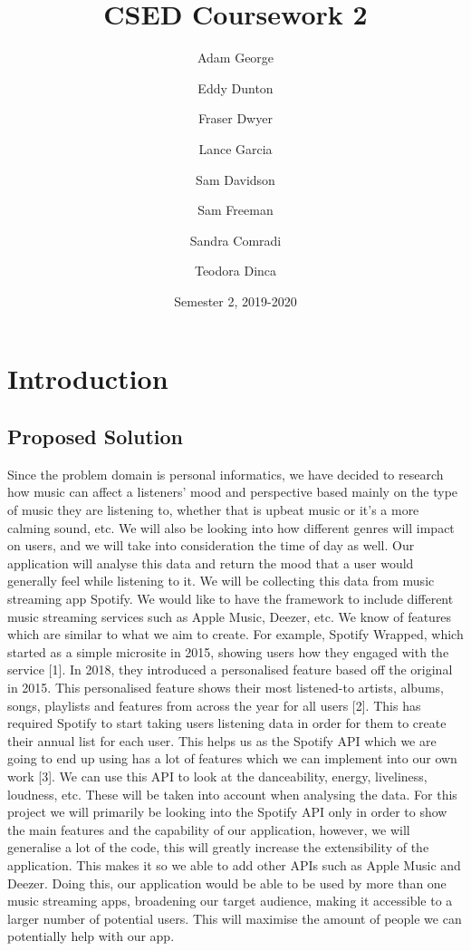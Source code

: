 \documentclass[12pt]{report}
\title{CSED Coursework 2}
\author{
	Adam George
	\and
	Eddy Dunton
	\and
	Fraser Dwyer
	\and	
	Lance Garcia
	\and
	Sam Davidson
	\and
	Sam Freeman
	\and
	Sandra Comradi
	\and
	Teodora Dinca
}
\date{Semester 2,  2019-2020}
\begin{document}
\begin{titlepage}
\maketitle
\end{titlepage}

\tableofcontents

\chapter{Introduction}

\section{Proposed Solution}

Since the problem domain is personal informatics, we have decided to research how music can affect a listeners' mood and perspective based mainly on the type of music they are listening to, whether that is upbeat music or it’s a more calming sound, etc. We will also be looking into how different genres will impact on users, and we will take into consideration the time of day as well. Our application will analyse this data and return the mood that a user would generally feel while listening to it. We will be collecting this data from music streaming app Spotify. We would like to have the framework to include different music streaming services such as Apple Music, Deezer, etc.
We know of features which are similar to what we aim to create. For example, Spotify Wrapped, which started as a simple microsite in 2015, showing users how they engaged with the service [1]. In 2018, they introduced a personalised feature based off the original in 2015. This personalised feature shows their most listened-to artists, albums, songs, playlists and features from across the year for all users [2]. This has required Spotify to start taking users listening data in order for them to create their annual list for each user. This helps us as the Spotify API which we are going to end up using has a lot of features which we can implement into our own work [3]. We can use this API to look at the danceability, energy, liveliness, loudness, etc. These will be taken into account when analysing the data.
For this project we will primarily be looking into the Spotify API only in order to show the main features and the capability of our application, however, we will generalise a lot of the code, this will greatly increase the extensibility of the application. This makes it so we able to add other APIs such as Apple Music and Deezer. Doing this, our application would be able to be used by more than one music streaming apps, broadening our target audience, making it accessible to a larger number of potential users. This will maximise the amount of people we can potentially help with our app.
\end{document}
